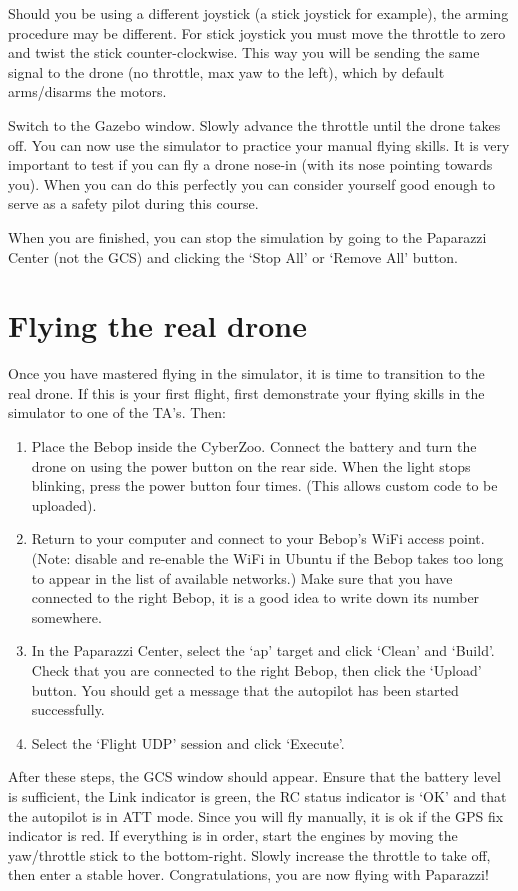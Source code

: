 Should you be using a different joystick (a stick joystick for example), the arming procedure may be different. For stick joystick you must move the throttle to zero and twist the stick counter-clockwise. This way you will be sending the same signal to the drone (no throttle, max yaw to the left), which by default arms/disarms the motors.

Switch to the Gazebo window. Slowly advance the throttle until the drone takes off.
You can now use the simulator to practice your manual flying skills. It is very important to test if you can fly a drone nose-in (with its nose pointing towards you). When you can do this perfectly you can consider yourself good enough to serve as a safety pilot during this course.

When you are finished, you can stop the simulation by going to the Paparazzi Center (not the GCS) and clicking the `Stop All'  or `Remove All'  button.

\section{Flying the real drone}
Once you have mastered flying in the simulator, it is time to transition to the real drone.
If this is your first flight, first demonstrate your flying skills in the simulator to one of the TA's.
Then:

\begin{enumerate}
	\item Place the Bebop inside the CyberZoo. Connect the battery and turn the drone on using the power button on the rear side. When the light stops blinking, press the power button four times. (This allows custom code to be uploaded).
	\item Return to your computer and connect to your Bebop's WiFi access point. (Note: disable and re-enable the WiFi in Ubuntu if the Bebop takes too long to appear in the list of available networks.)
	Make sure that you have connected to the right Bebop, it is a good idea to write down its number somewhere.
	\item In the Paparazzi Center, select the `ap' target and click `Clean' and `Build'. Check that you are connected to the right Bebop, then click the `Upload' button. You should get a message that the autopilot has been started successfully.
	\item Select the `Flight UDP' session and click `Execute'.
\end{enumerate}

After these steps, the GCS window should appear.
Ensure that the battery level is sufficient, the Link indicator is green, the RC status indicator is `OK' and that the autopilot is in ATT mode. Since you will fly manually, it is ok if the GPS fix indicator is red.
If everything is in order, start the engines by moving the yaw/throttle stick to the bottom-right. Slowly increase the throttle to take off, then enter a stable hover. Congratulations, you are now flying with Paparazzi!

